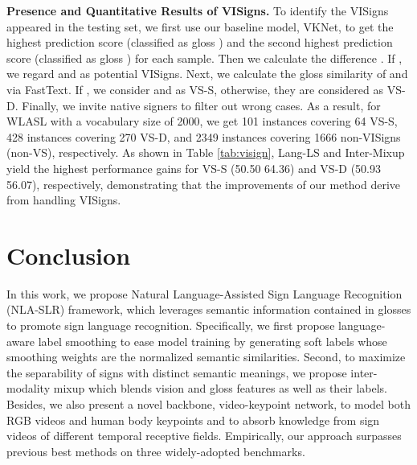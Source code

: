 \documentclass[10pt,twocolumn,letterpaper]{article}
\begin{document}
\begin{table}[t]
\centering
{}
\vspace{-3mm}
\caption{Quantitative results over VISigns. We report top-1 accuracy on WLASL2000. 
(VS-S/D: VISigns with similar/distinct semantic meanings.)
}
\label{tab:visign}
\vspace{-5mm}
\end{table}


\noindent \textbf{Presence and Quantitative Results of VISigns.}
To identify the VISigns appeared in the testing set, we first use our baseline model, VKNet, to get the highest prediction score  (classified as gloss ) and the second highest prediction score  (classified as gloss ) for each sample. Then we calculate the difference . If , we regard  and  as potential VISigns. Next, we calculate the gloss similarity  of  and  via FastText. If , we consider  and  as VS-S, otherwise, they are considered as VS-D. Finally, we invite native signers to filter out wrong cases. As a result, for WLASL with a vocabulary size of 2000, we get 101 instances covering 64 VS-S, 428 instances covering 270 VS-D, and 2349 instances covering 1666 non-VISigns (non-VS), respectively. As shown in Table \ref{tab:visign}, Lang-LS and Inter-Mixup yield the highest performance gains for VS-S (50.50  64.36) and VS-D (50.93  56.07), respectively, demonstrating that the improvements of our method derive from handling VISigns. \vspace{-2mm}
\section{Conclusion}
\vspace{-1mm}
In this work, we propose Natural Language-Assisted Sign Language Recognition (NLA-SLR) framework, which leverages semantic information contained in glosses to promote sign language recognition.
Specifically, we first propose language-aware label smoothing to ease model training by generating soft labels whose smoothing
weights are the normalized semantic similarities.
Second, to maximize the separability of signs with distinct semantic meanings, we propose inter-modality mixup which blends vision and gloss features as well as their labels.
Besides, we also present a novel backbone, video-keypoint network, to model both RGB videos and human body keypoints and to absorb knowledge from sign videos of different temporal receptive fields.
Empirically, our approach surpasses previous best methods on three widely-adopted benchmarks.
\end{document}
